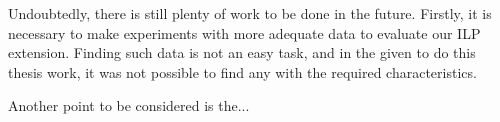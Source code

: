 Undoubtedly, there is still plenty of work to be done in the future. Firstly, it is necessary to make experiments with
more adequate data to evaluate our ILP extension. Finding such data is not an easy task, and in the given to do this
thesis work, it was not possible to find any with the required characteristics. 

Another point to be considered is the...


























